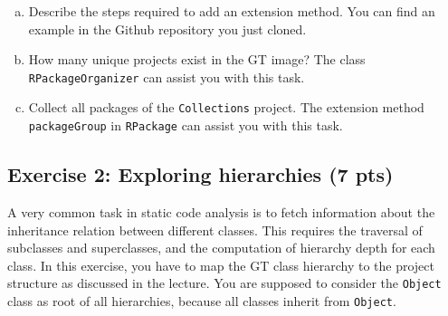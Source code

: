 \documentclass [11pt, a4wide, twoside]{article}
\begin{document}
\begin{enumerate}[a)]
\item Describe the steps required to add an extension method. You can find an example in the Github repository you just cloned.
\item How many unique projects exist in the GT image? The class \texttt{RPackageOrganizer} can assist you with this task.
\item Collect all packages of the \texttt{Collections} project. The extension method \texttt{packageGroup} in \texttt{RPackage} can assist you with this task.
\end{enumerate}

\subsection*{Exercise 2: Exploring hierarchies (7 pts)}
A very common task in static code analysis is to fetch information about the inheritance relation between different classes. This requires the traversal of subclasses and superclasses, and the computation of hierarchy depth for each class. %
In this exercise, you have to map the GT class hierarchy to the project structure as discussed in the lecture.
You are supposed to consider the \texttt{Object} class as root of all hierarchies, because all classes inherit from \texttt{Object}.
\end{document}
